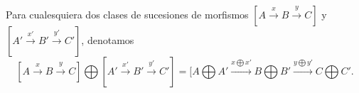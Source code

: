 \documentclass[preview]{standalone}
\begin{document}
\begin{center}
Para cualesquiera dos clases de sucesiones de morfismos $[A\xrightarrow{x}B\xrightarrow{y}C]$ y $[A'\xrightarrow{x'}B'\xrightarrow{y'}C']$, denotamos $$[A\xrightarrow{x}B\xrightarrow{y}C]\bigoplus[A'\xrightarrow{x'}B'\xrightarrow{y'}C'] = \bigg[A\bigoplus A' \xrightarrow{x\bigoplus x'} B\bigoplus B' \xrightarrow{y\bigoplus y'} C\bigoplus C'.$$
\end{center}
\end{document}
